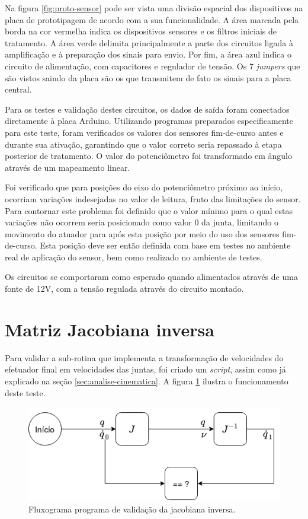 Na figura \ref{fig:proto-sensor} pode ser vista uma divisão espacial dos dispositivos
na placa de prototipagem de acordo com a sua funcionalidade. A área marcada pela
borda na cor vermelha indica os dispositivos sensores e os filtros iniciais de tratamento.
A área verde delimita principalmente a parte dos circuitos ligada à amplificação e à
preparação dos sinais para envio. Por fim, a área azul indica o circuito de alimentação,
com capacitores e regulador de tensão. Os 7 \textit{jumpers} que são vistos saindo da
placa são os que transmitem de fato os sinais para a placa central.

Para os testes e validação destes circuitos, os dados de saída foram conectados
diretamente à placa Arduino. Utilizando programas preparados especificamente para
este teste, foram verificados os valores dos sensores fim-de-curso antes e durante
sua ativação, garantindo que o valor correto seria repassado à etapa posterior
de tratamento. O valor do potenciômetro foi transformado em ângulo através de um
mapeamento linear. 

Foi verificado que para posições do eixo do potenciômetro próximo ao início, 
ocorriam variações indesejadas no valor de leitura, fruto das limitações do sensor.
Para contornar este problema foi definido que o valor mínimo para o qual estas 
variações não ocorrem seria posicionado como valor 0 da junta, limitando o movimento
do atuador para após esta posição por meio do uso dos sensores fim-de-curso. Esta posição
deve ser então definida com base em testes no ambiente real de aplicação do sensor, bem como
realizado no ambiente de testes.

Os circuitos se comportaram como esperado quando alimentados através de uma fonte de 
12V, com a tensão regulada através do circuito montado.

\section{Matriz Jacobiana inversa}
\label{sec:resultados-rotina}

Para validar a sub-rotina que implementa a transformação de velocidades do efetuador final
em velocidades das juntas, foi criado um \textit{script}, assim como já explicado na seção
\ref{sec:analise-cinematica}. A figura \ref{fig:test-vel} ilustra o funcionamento deste teste.

\begin{figure}[ht]
    \caption{Fluxograma programa de validação da jacobiana inversa.}

    \begin{centering}
        \includegraphics[width=0.6\columnwidth]{images/resultados/Test-vel.png} 
    \par\end{centering}

    \label{fig:test-vel}
\end{figure}


